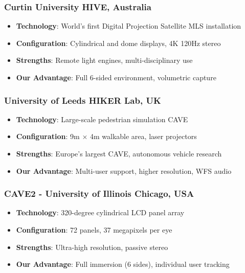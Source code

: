 \subsubsection{Curtin University HIVE, Australia}

\begin{itemize}
    \item \textbf{Technology}: World's first Digital Projection Satellite MLS installation
    \item \textbf{Configuration}: Cylindrical and dome displays, 4K 120Hz stereo
    \item \textbf{Strengths}: Remote light engines, multi-disciplinary use
    \item \textbf{Our Advantage}: Full 6-sided environment, volumetric capture
\end{itemize}

\subsubsection{University of Leeds HIKER Lab, UK}

\begin{itemize}
    \item \textbf{Technology}: Large-scale pedestrian simulation CAVE
    \item \textbf{Configuration}: 9m × 4m walkable area, laser projectors
    \item \textbf{Strengths}: Europe's largest CAVE, autonomous vehicle research
    \item \textbf{Our Advantage}: Multi-user support, higher resolution, WFS audio
\end{itemize}

\subsubsection{CAVE2 - University of Illinois Chicago, USA}

\begin{itemize}
    \item \textbf{Technology}: 320-degree cylindrical LCD panel array
    \item \textbf{Configuration}: 72 panels, 37 megapixels per eye
    \item \textbf{Strengths}: Ultra-high resolution, passive stereo
    \item \textbf{Our Advantage}: Full immersion (6 sides), individual user tracking
\end{itemize}

